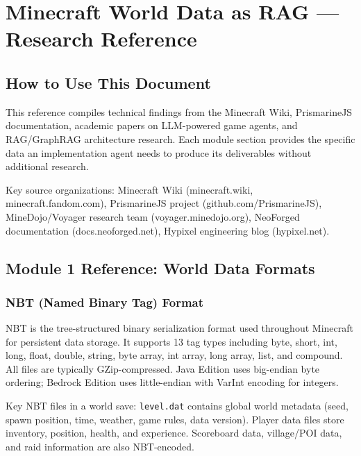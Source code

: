 \documentclass[11pt,letterpaper]{article}
\newcommand{\stageheader}[2]{%
  \noindent\colorbox{#2}{\makebox[\textwidth][l]{%
    \textcolor{white}{\bfseries\sffamily\hspace{6pt}#1\hspace{6pt}}}}%
  \vspace{0.5em}\par%
}
\begin{document}
\newpage

\stageheader{STAGE 2 --- RESEARCH REFERENCE}{secondary}

\section{Minecraft World Data as RAG --- Research Reference}

\subsection{How to Use This Document}

This reference compiles technical findings from the Minecraft Wiki, PrismarineJS documentation, academic papers on LLM-powered game agents, and RAG/GraphRAG architecture research. Each module section provides the specific data an implementation agent needs to produce its deliverables without additional research.

Key source organizations: Minecraft Wiki (minecraft.wiki, minecraft.fandom.com), PrismarineJS project (github.com/PrismarineJS), MineDojo/Voyager research team (voyager.minedojo.org), NeoForged documentation (docs.neoforged.net), Hypixel engineering blog (hypixel.net).

\subsection{Module 1 Reference: World Data Formats}

\subsubsection{NBT (Named Binary Tag) Format}
NBT is the tree-structured binary serialization format used throughout Minecraft for persistent data storage. It supports 13 tag types including byte, short, int, long, float, double, string, byte array, int array, long array, list, and compound. All files are typically GZip-compressed. Java Edition uses big-endian byte ordering; Bedrock Edition uses little-endian with VarInt encoding for integers.

Key NBT files in a world save: \texttt{level.dat} contains global world metadata (seed, spawn position, time, weather, game rules, data version). Player data files store inventory, position, health, and experience. Scoreboard data, village/POI data, and raid information are also NBT-encoded.
\end{document}
